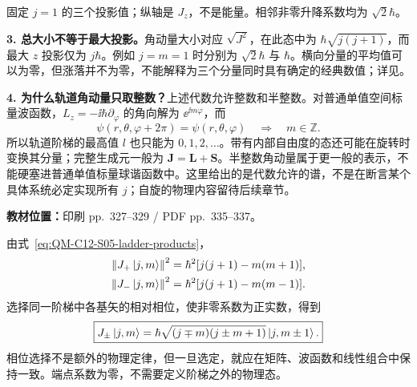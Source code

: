 \begin{center}

\small 固定 $j=1$ 的三个投影值；纵轴是 $J_z$，不是能量。相邻非零升降系数均为 $\sqrt2\hbar$。
\end{center}

\textbf{3. 总大小不等于最大投影。}角动量大小对应 $\sqrt{J^2}$，在此态中为 $\hbar\sqrt{j(j+1)}$，而最大 $z$ 投影仅为 $j\hbar$。例如 $j=m=1$ 时分别为 $\sqrt2\hbar$ 与 $\hbar$。横向分量的平均值可以为零，但涨落并不为零，不能解释为三个分量同时具有确定的经典数值；详见。

\textbf{4. 为什么轨道角动量只取整数？}上述代数允许整数和半整数。对普通单值空间标量波函数，$L_z=-\ii\hbar\partial_\varphi$ 的角向解为 $\ee^{\ii m\varphi}$，而
\begin{equation}
  \psi(r,\theta,\varphi+2\pi)=\psi(r,\theta,\varphi)
  \quad\Longrightarrow\quad m\in\mathbb Z.
\end{equation}
所以轨道阶梯的最高值 $l$ 也只能为 $0,1,2,\ldots$。带有内部自由度的态还可能在旋转时变换其分量；完整生成元一般为 $\mathbf J=\mathbf L+\mathbf S$。半整数角动量属于更一般的表示，不能硬塞进普通单值标量球谐函数中。这里给出的是代数允许的谱，不是在断言某个具体系统必定实现所有 $j$；自旋的物理内容留待后续章节。

\textbf{教材位置：}印刷 pp.~327--329 / PDF pp.~335--337。

由式~\eqref{eq:QM-C12-S05-ladder-products}，
\begin{align}
  \left\lVert J_+\left|j,m\right\rangle \right\rVert^2
    &=\hbar^2[j(j+1)-m(m+1)],\notag\\
  \left\lVert J_-\left|j,m\right\rangle \right\rVert^2
    &=\hbar^2[j(j+1)-m(m-1)].
\end{align}
选择同一阶梯中各基矢的相对相位，使非零系数为正实数，得到
\begin{equation}
  \boxed{J_\pm\left|j,m\right\rangle
    =\hbar\sqrt{(j\mp m)(j\pm m+1)}\left|j,m\pm1\right\rangle.}
  \label{eq:QM-C12-S05-ladder-action}
\end{equation}
相位选择不是额外的物理定律，但一旦选定，就应在矩阵、波函数和线性组合中保持一致。端点系数为零，不需要定义阶梯之外的物理态。


